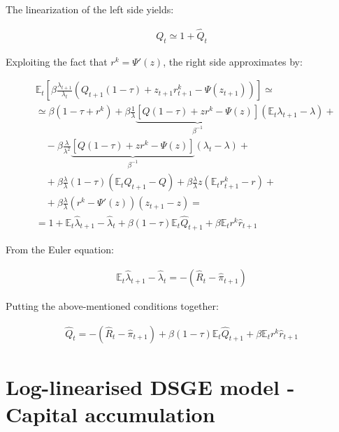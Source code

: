 \documentclass{pracamgr}
\numberwithin{equation}{section}
\begin{document}
The linearization of the left side yields:

\begin{align}
Q_{t} \simeq 1 + \hat{Q}_{t}
\end{align}

Exploiting the fact that $r^{k} = \Psi'(z)$, the right side approximates by:

\begin{align}
&  \mathbb{E}_{t} \left[ \beta \frac{\lambda_{t+1}}{\lambda_{t}} \left( Q_{t+1}(1-\tau) + z_{t+1}r_{t+1}^{k} - \Psi(z_{t+1}) \right) \right]  \simeq \nonumber \\
& \simeq \beta \left( 1 - \tau + r^{k} \right) +  \beta \frac{1}{\lambda} \underbrace{\left[ Q(1-\tau) + zr^{k} - \Psi(z) \right] }_{\beta^{-1}} \left(\mathbb{E}_{t} \lambda_{t+1} - \lambda \right) + \nonumber \\
& \quad -  \beta \frac{\lambda}{\lambda^{2}} \underbrace{ \left[ Q(1-\tau) + zr^{k} - \Psi(z) \right] }_{\beta^{-1}}\left(\lambda_{t} - \lambda \right) + \nonumber \\
& \quad + \beta \frac{\lambda}{\lambda} \left(1-\tau \right)\left( \mathbb{E}_{t} Q_{t+1} - Q \right) + \beta \frac{\lambda}{\lambda} z \left(  \mathbb{E}_{t} r^{k}_{t+1} - r \right) + \nonumber \\
& \quad + \beta \frac{\lambda}{\lambda} \left( r^{k} - \Psi'(z) \right) \left( z_{t+1} - z \right) = \nonumber \\
& = 1 + \mathbb{E}_{t} \hat{\lambda}_{t+1} - \hat{\lambda}_{t} + \beta(1-\tau)\mathbb{E}_{t}\hat{Q}_{t+1} + \beta \mathbb{E}_{t} r^{k} \hat{r}_{t+1}
\end{align}

From the Euler equation:

\begin{align}
\mathbb{E}_{t}\hat{\lambda}_{t+1} - \hat{\lambda}_{t} = - \left( \hat{R}_{t} - \hat{\pi}_{t+1} \right)
\end{align}

Putting the above-mentioned conditions together:

\begin{align}
\hat{Q}_{t} = - \left( \hat{R}_{t} - \hat{\pi}_{t+1}  \right) +  \beta(1-\tau)\mathbb{E}_{t}\hat{Q}_{t+1} + \beta \mathbb{E}_{t} r^{k} \hat{r}_{t+1}
\end{align}

\section*{Log-linearised DSGE model - Capital accumulation}
\end{document}
